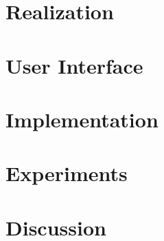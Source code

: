 \documentclass[journal]{vgtc}                %
\theoremstyle{definition}
\newcommand{\lstopar}[1]{\textcolor{blue}{#1}}
\begin{document}
\section{Realization}
\label{sec:multiscale-implementation}


\section{User Interface}
\label{sec:ui}


\section{Implementation}
\label{sec:implementation}


\section{Experiments}
\label{sec:experiments}


\section{Discussion}
\label{sec:discussion}










\end{document}
